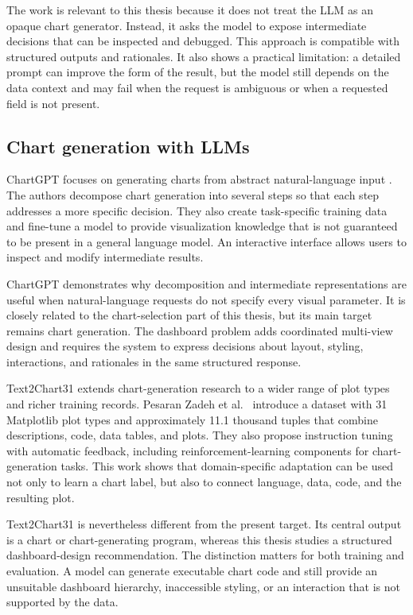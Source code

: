 The work is relevant to this thesis because it does not treat the LLM as an opaque chart generator. Instead, it asks the model to expose intermediate decisions that can be inspected and debugged. This approach is compatible with structured outputs and rationales. It also shows a practical limitation: a detailed prompt can improve the form of the result, but the model still depends on the data context and may fail when the request is ambiguous or when a requested field is not present.

\subsection{Chart generation with LLMs}

ChartGPT focuses on generating charts from abstract natural-language input \cite{tian2025chartgpt}. The authors decompose chart generation into several steps so that each step addresses a more specific decision. They also create task-specific training data and fine-tune a model to provide visualization knowledge that is not guaranteed to be present in a general language model. An interactive interface allows users to inspect and modify intermediate results.

ChartGPT demonstrates why decomposition and intermediate representations are useful when natural-language requests do not specify every visual parameter. It is closely related to the chart-selection part of this thesis, but its main target remains chart generation. The dashboard problem adds coordinated multi-view design and requires the system to express decisions about layout, styling, interactions, and rationales in the same structured response.

Text2Chart31 extends chart-generation research to a wider range of plot types and richer training records. Pesaran Zadeh et al.~\cite{zadeh2024text2chart31} introduce a dataset with 31 Matplotlib plot types and approximately 11.1 thousand tuples that combine descriptions, code, data tables, and plots. They also propose instruction tuning with automatic feedback, including reinforcement-learning components for chart-generation tasks. This work shows that domain-specific adaptation can be used not only to learn a chart label, but also to connect language, data, code, and the resulting plot.

Text2Chart31 is nevertheless different from the present target. Its central output is a chart or chart-generating program, whereas this thesis studies a structured dashboard-design recommendation. The distinction matters for both training and evaluation. A model can generate executable chart code and still provide an unsuitable dashboard hierarchy, inaccessible styling, or an interaction that is not supported by the data.

